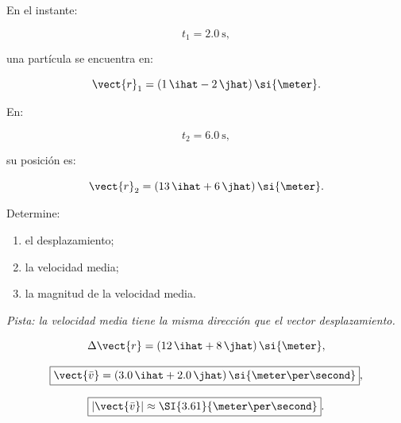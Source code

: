 \begin{ejercicio}
En el instante:

\[
t_1=\SI{2.0}{\second},
\]

una partícula se encuentra en:

\[
\vect{r}_1=(1\,\ihat-2\,\jhat)\,\si{\meter}.
\]

En:

\[
t_2=\SI{6.0}{\second},
\]

su posición es:

\[
\vect{r}_2=(13\,\ihat+6\,\jhat)\,\si{\meter}.
\]

Determine:

\begin{enumerate}[label=\alph*)]
    \item el desplazamiento;
    \item la velocidad media;
    \item la magnitud de la velocidad media.
\end{enumerate}

\textit{Pista: la velocidad media tiene la misma dirección que el vector desplazamiento.}
\end{ejercicio}

\begin{respuesta}
\[
\Delta\vect{r}
=
(12\,\ihat+8\,\jhat)\,\si{\meter},
\]

\[
\boxed{
\vect{\bar{v}}
=
(3.0\,\ihat+2.0\,\jhat)\,\si{\meter\per\second}
},
\]

\[
\boxed{|\vect{\bar{v}}|\approx\SI{3.61}{\meter\per\second}}.
\]
\end{respuesta}

